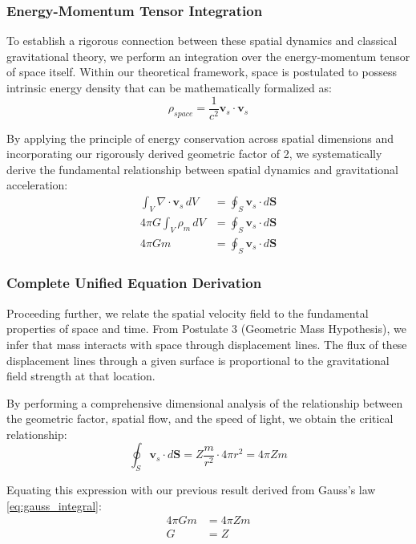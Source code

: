 \documentclass[12pt]{article}
\numberwithin{equation}{section}
\begin{document}
\subsubsection{Energy-Momentum Tensor Integration}

To establish a rigorous connection between these spatial dynamics and classical gravitational theory, we perform an integration over the energy-momentum tensor of space itself. Within our theoretical framework, space is postulated to possess intrinsic energy density that can be mathematically formalized as:
\begin{equation}
\rho_{space} = \frac{1}{c^2}\mathbf{v}_s \cdot \mathbf{v}_s
\label{eq:spatial_energy_density}
\end{equation}

By applying the principle of energy conservation across spatial dimensions and incorporating our rigorously derived geometric factor of 2, we systematically derive the fundamental relationship between spatial dynamics and gravitational acceleration:
\begin{align}
\int_V \nabla \cdot \mathbf{v}_s \, dV &= \oint_S \mathbf{v}_s \cdot d\mathbf{S} \\
4\pi G\int_V \rho_m \, dV &= \oint_S \mathbf{v}_s \cdot d\mathbf{S} \\
4\pi Gm &= \oint_S \mathbf{v}_s \cdot d\mathbf{S}
\label{eq:gauss_integral}
\end{align}

\subsubsection{Complete Unified Equation Derivation}

Proceeding further, we relate the spatial velocity field to the fundamental properties of space and time. From Postulate 3 (Geometric Mass Hypothesis), we infer that mass interacts with space through displacement lines. The flux of these displacement lines through a given surface is proportional to the gravitational field strength at that location.

By performing a comprehensive dimensional analysis of the relationship between the geometric factor, spatial flow, and the speed of light, we obtain the critical relationship:
\begin{equation}
\oint_S \mathbf{v}_s \cdot d\mathbf{S} = Z\frac{m}{r^2} \cdot 4\pi r^2 = 4\pi Zm
\label{eq:flow_integral}
\end{equation}

Equating this expression with our previous result derived from Gauss's law \eqref{eq:gauss_integral}:
\begin{align}
4\pi Gm &= 4\pi Zm \\
G &= Z
\label{eq:preliminary_relation}
\end{align}
\end{document}
